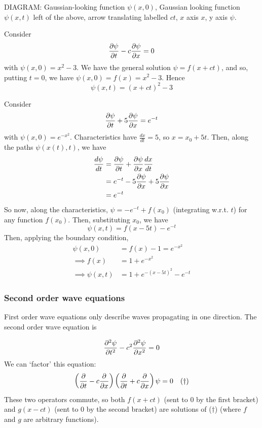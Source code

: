 \documentclass{../../template/note}
\begin{document}
    DIAGRAM:
    Gaussian-looking function \(\psi(x, 0)\), Gaussian looking function \(\psi(x, t)\) left of the above, arrow translating labelled \(ct\), \(x\) axis \(x\), y axis \(\psi\).

    \begin{example}
        Consider
        \[
            \pd \psi t - c \pd \psi x = 0
        \]
        with \(\psi(x, 0) = x^2-3\). We have the general solution \(\psi = f(x + ct)\), and so, putting \(t=0\), we have \(\psi(x, 0) = f(x) = x^2-3\). Hence
        \[
            \psi(x, t) = (x+ct)^2-3
        \]
    \end{example}
    
    \begin{example}
        Consider
        \[
            \pd \psi t + 5 \pd \psi x = e^{-t}
        \]
        with \(\psi(x, 0) = e^{-x^2}\). Characteristics have \(\frac{dx}{dt} = 5\), so \(x = x_0 + 5t\). Then, along the paths \(\psi(x(t), t)\), we have
        \begin{align*}
            \frac{d\psi}{dt} &= \pd \psi t + \pd \psi x \frac{dx}{dt} \\
            &= e^{-t} - 5 \pd \psi x + 5 \pd \psi x \\
            &= e^{-t}
        \end{align*}
        So now, along the characteristics, \(\psi = -e^{-t} + f(x_0)\) (integrating w.r.t. \(t\)) for any function \(f(x_0)\). Then, substituting \(x_0\), we have
        \[
            \psi(x, t) = f(x - 5t) - e^{-t}
        \]
        Then, applying the boundary condition,
        \begin{align*}
            \psi(x, 0) &= f(x) - 1 = e^{-x^2} \\
            \implies f(x) &= 1 + e^{-x^2} \\
            \implies \psi(x, t) &= 1 + e^{-(x-5t)^2} - e^{-t}
        \end{align*}
    \end{example}
    
    \subsubsection{Second order wave equations}

    First order wave equations only describe waves propagating in one direction. The second order wave equation is

    \[
        \pd {^2\psi}{t^2} - c^2 \pd{^2\psi}{x^2} = 0
    \]
    We can `factor' this equation:
    \begin{align*}
        \left(\pd{}{t} - c \pd{}{x}\right)\left(\pd{}{t} + c \pd{}{x}\right)\psi = 0 && (\dagger)
    \end{align*}
    These two operators commute, so both \(f(x + ct)\) (sent to 0 by the first bracket) and \(g(x - ct)\) (sent to 0 by the second bracket) are solutions of (\(\dagger\)) (where \(f\) and \(g\) are arbitrary functions).
\end{document}
